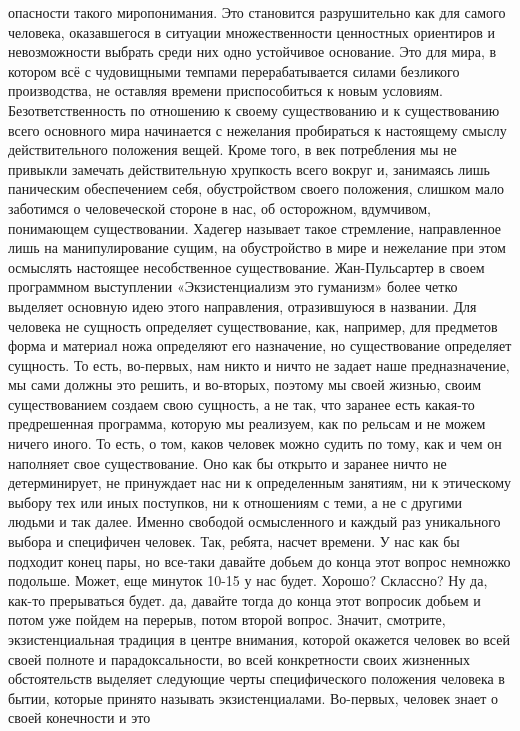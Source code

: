 опасности такого миропонимания. Это становится разрушительно как для самого
человека, оказавшегося в ситуации множественности ценностных ориентиров и
невозможности выбрать среди них одно устойчивое основание. Это для мира, в
котором всё с чудовищными темпами перерабатывается силами безликого
производства, не оставляя времени приспособиться к новым условиям.
Безответственность по отношению к своему существованию и к существованию всего
основного мира начинается с нежелания пробираться к настоящему смыслу
действительного положения вещей. Кроме того, в век потребления мы не привыкли
замечать действительную хрупкость всего вокруг и, занимаясь лишь паническим
обеспечением себя, обустройством своего положения, слишком мало заботимся о
человеческой стороне в нас, об осторожном, вдумчивом, понимающем существовании.
Хадегер называет такое стремление, направленное лишь на манипулирование сущим,
на обустройство в мире и нежелание при этом осмыслять настоящее несобственное
существование. Жан-Пульсартер в своем программном выступлении «Экзистенциализм
это гуманизм» более четко выделяет основную идею этого направления, отразившуюся
в названии. Для человека не сущность определяет существование, как, например,
для предметов форма и материал ножа определяют его назначение, но существование
определяет сущность. То есть, во-первых, нам никто и ничто не задает наше
предназначение, мы сами должны это решить, и во-вторых, поэтому мы своей жизнью,
своим существованием создаем свою сущность, а не так, что заранее есть какая-то
предрешенная программа, которую мы реализуем, как по рельсам и не можем ничего
иного. То есть, о том, каков человек можно судить по тому, как и чем он
наполняет свое существование. Оно как бы открыто и заранее ничто не
детерминирует, не принуждает нас ни к определенным занятиям, ни к этическому
выбору тех или иных поступков, ни к отношениям с теми, а не с другими людьми и
так далее. Именно свободой осмысленного и каждый раз уникального выбора и
специфичен человек. Так, ребята, насчет времени. У нас как бы подходит конец
пары, но все-таки давайте добьем до конца этот вопрос немножко подольше. Может,
еще минуток 10-15 у нас будет. Хорошо? Склассно? Ну да, как-то прерываться
будет. да, давайте тогда до конца этот вопросик добьем и потом уже пойдем на
перерыв, потом второй вопрос. Значит, смотрите, экзистенциальная традиция в
центре внимания, которой окажется человек во всей своей полноте и
парадоксальности, во всей конкретности своих жизненных обстоятельств выделяет
следующие черты специфического положения человека в бытии, которые принято
называть экзистенциалами. Во-первых, человек знает о своей конечности и это
